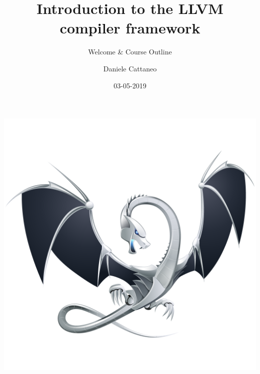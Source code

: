 \documentclass[10pt,mathserif]{beamer}
\author{Daniele Cattaneo}
\institute{Politecnico di Milano}
\date{03-05-2019}
\title{Introduction to the LLVM compiler framework}
\subtitle{Welcome \& Course Outline}
\begin{document}
\begin{frame}
\maketitle
\end{frame}

\begin{frame}[plain]{}
  \begin{center}
    \vspace{-.1\textheight}
    \includegraphics[width=\textwidth]{img/logo.png}
  \end{center}
\end{frame}
\end{document}
